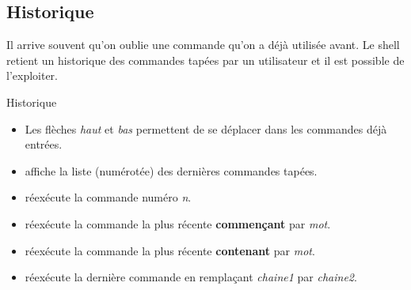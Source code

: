 \documentclass[a4paper,11pt]{style-esi/td}
\begin{document}



	\subsection{Historique}

		Il arrive souvent qu'on oublie une commande qu'on a déjà utilisée avant.
		Le shell retient un historique des commandes tapées par un utilisateur
		et il est possible de l'exploiter.
		
		\begin{theorie}{Historique}
			\begin{itemize}
			\item 
				Les flèches \emph{haut} et \emph{bas}
				permettent de se déplacer dans les commandes déjà entrées.
			\item 
				 affiche la liste (numérotée)
				des dernières commandes tapées.
			\item 
				 réexécute la commande numéro \emph{n}.
			\item 
				 réexécute la commande la plus récente 
				\textbf{commençant} par \emph{mot}.
			\item 
				 réexécute la commande la plus récente 
				\textbf{contenant} par \emph{mot}.
			\item 
				 réexécute la dernière commande
				en remplaçant \emph{chaine1} par \emph{chaine2}.
			\end{itemize}
		\end{theorie}
				
\end{document}
